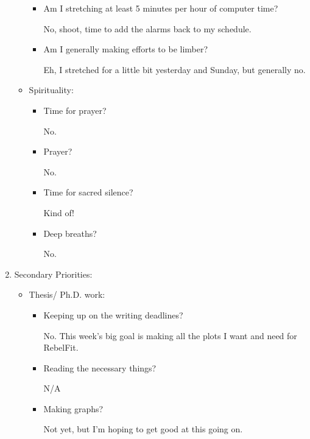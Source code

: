 \documentclass[12pt]{article}
\renewcommand{\,}{\textsuperscript{,}}
\begin{document}
\begin{enumerate}
\begin{itemize}
\begin{itemize}

\item Am I stretching at least 5 minutes per hour of computer time?

No, shoot, time to add the alarms back to my schedule.

\item Am I generally making efforts to be limber?

Eh, I stretched for a little bit yesterday and Sunday, but generally no.

\end{itemize}

\item Spirituality:

\begin{itemize}

\item Time for prayer?

No.

\item Prayer?

No.

\item Time for sacred silence?

Kind of!

\item Deep breaths?

No.

\end{itemize}

\end{itemize}

\item Secondary Priorities:

\begin{itemize}

\item Thesis/ Ph.D. work:

\begin{itemize}

\item Keeping up on the writing deadlines?

No. This week's big goal is making all the plots I want and need for RebelFit.

\item Reading the necessary things?

N/A

\item Making graphs?

Not yet, but I'm hoping to get good at this going on.


\end{itemize}
\end{itemize}
\end{enumerate}
\end{document}
